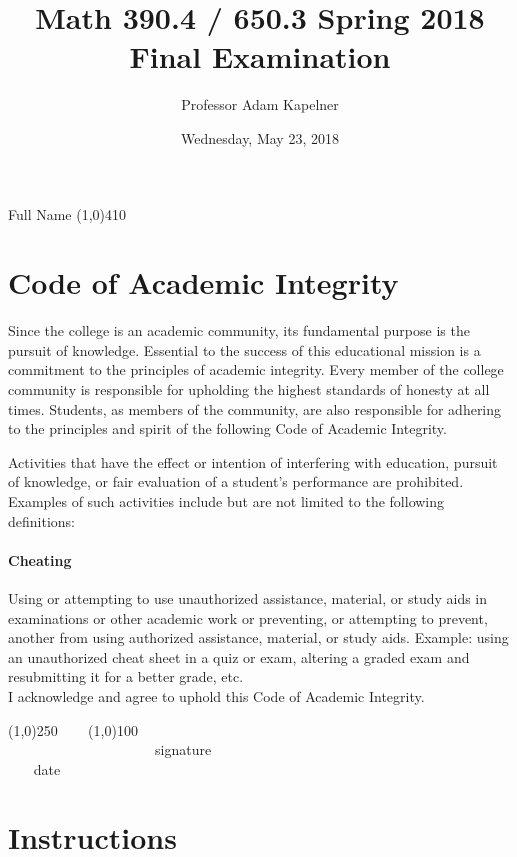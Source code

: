 \documentclass[12pt]{article}
\title{Math 390.4 / 650.3 Spring 2018 \\ Final Examination}
\author{Professor Adam Kapelner}
\date{Wednesday, May 23, 2018}
\begin{document}
\maketitle

\noindent Full Name \line(1,0){410}

\thispagestyle{empty}

\section*{Code of Academic Integrity}

\footnotesize
Since the college is an academic community, its fundamental purpose is the pursuit of knowledge. Essential to the success of this educational mission is a commitment to the principles of academic integrity. Every member of the college community is responsible for upholding the highest standards of honesty at all times. Students, as members of the community, are also responsible for adhering to the principles and spirit of the following Code of Academic Integrity.

Activities that have the effect or intention of interfering with education, pursuit of knowledge, or fair evaluation of a student's performance are prohibited. Examples of such activities include but are not limited to the following definitions:

\paragraph{Cheating} Using or attempting to use unauthorized assistance, material, or study aids in examinations or other academic work or preventing, or attempting to prevent, another from using authorized assistance, material, or study aids. Example: using an unauthorized cheat sheet in a quiz or exam, altering a graded exam and resubmitting it for a better grade, etc.
\\

\noindent I acknowledge and agree to uphold this Code of Academic Integrity. \\

\begin{center}
\line(1,0){250} ~~~ \line(1,0){100}\\
~~~~~~~~~~~~~~~~~~~~~signature~~~~~~~~~~~~~~~~~~~~~~~~~~~~~~~~~~~~~~~~~~~~~ date
\end{center}

\normalsize

\section*{Instructions}
\end{document}

